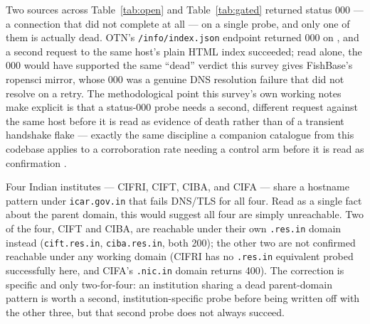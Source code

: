  Two sources across Table~\ref{tab:open} and
Table~\ref{tab:gated} returned status 000 --- a connection that did not
complete at all --- on a single probe, and only one of them is actually dead.
OTN's \texttt{/info/index.json} endpoint returned 000 on \ProbeDate{}, and a
second request to the same host's plain HTML index succeeded; read alone,
the 000 would have supported the same ``dead'' verdict this survey gives
FishBase's ropensci mirror, whose 000 was a genuine DNS resolution failure
that did not resolve on a retry. The methodological point this survey's own
working notes make explicit is that a status-000 probe needs a second,
different request against the same host before it is read as evidence of
death rather than of a transient handshake flake --- exactly the same
discipline a companion catalogue from this codebase applies to a corroboration
rate needing a control arm before it is read as confirmation
\citep{silentfailures2026}.

Four Indian institutes --- CIFRI, CIFT, CIBA, and CIFA --- share a hostname
pattern under \texttt{icar.gov.in} that fails DNS/TLS for all four. Read as a
single fact about the parent domain, this would suggest all four are
simply unreachable. Two of the four, CIFT and CIBA, are reachable under their
own \texttt{.res.in} domain instead (\texttt{cift.res.in},
\texttt{ciba.res.in}, both 200); the other two are not confirmed reachable
under any working domain (CIFRI has no \texttt{.res.in} equivalent probed
successfully here, and CIFA's \texttt{.nic.in} domain returns 400). The
correction is specific and only two-for-four: an institution sharing a dead
parent-domain pattern is worth a second, institution-specific probe before
being written off with the other three, but that second probe does not
always succeed.

